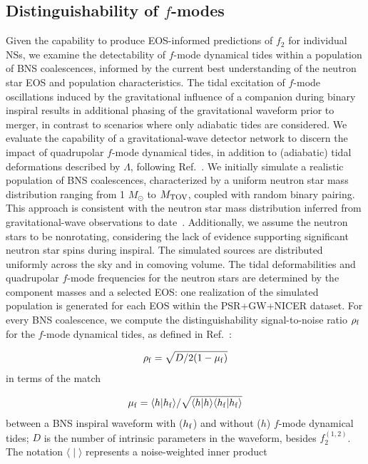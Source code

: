 \documentclass[aps,prd,twocolumn,superscriptaddress,footinbib]{revtex4-1}
\begin{document}
\subsection{Distinguishability of $f$-modes}

Given the capability to produce EOS-informed predictions of $f_2$ for individual NSs, we examine the detectability of $f$-mode dynamical tides within a population of BNS coalescences, informed by the current best understanding of the neutron star EOS and population characteristics. The tidal excitation of $f$-mode oscillations induced by the gravitational influence of a companion during binary inspiral results in additional phasing of the gravitational waveform prior to merger, in contrast to scenarios where only adiabatic tides are considered. We evaluate the capability of a gravitational-wave detector network to discern the impact of quadrupolar $f$-mode dynamical tides, in addition to (adiabatic) tidal deformations described by $\Lambda$, following Ref.~\cite{WilliamsPratten2022}. We initially simulate a realistic population of BNS coalescences, characterized by a uniform neutron star mass distribution ranging from 1 $M_\odot$ to $M_{\rm TOV}$, coupled with random binary pairing. This approach is consistent with the neutron star mass distribution inferred from gravitational-wave observations to date~\cite{LandryRead2021,O3bPop}. Additionally, we assume the neutron stars to be nonrotating, considering the lack of evidence supporting significant neutron star spins during inspiral. The simulated sources are distributed uniformly across the sky and in comoving volume. The tidal deformabilities and quadrupolar $f$-mode frequencies for the neutron stars are determined by the component masses and a selected EOS: one realization of the simulated population is generated for each EOS within the PSR+GW+NICER dataset. For every BNS coalescence, we compute the distinguishability signal-to-noise ratio $\rho_{\rm f}$ for the $f$-mode dynamical tides, as defined in Ref.~\cite{WilliamsPratten2022}:


\begin{equation}
\rho_{\rm f} = \sqrt{D/2(1-\mu_{\rm f})}
\end{equation}
in terms of the match

\begin{equation}
    \mu_{\rm f} = \langle h|h_{\rm f} \rangle/\sqrt{\langle h|h\rangle \langle h_{\rm f}|h_{\rm f} \rangle} 
\end{equation}
between a BNS inspiral waveform with ($h_{\rm f}$) and without ($h$) $f$-mode dynamical tides; $D$ is the number of intrinsic parameters in the waveform, besides $f_2^{(1,2)}$. The notation $\langle \; | \; \rangle$ represents a noise-weighted inner product
\end{document}
